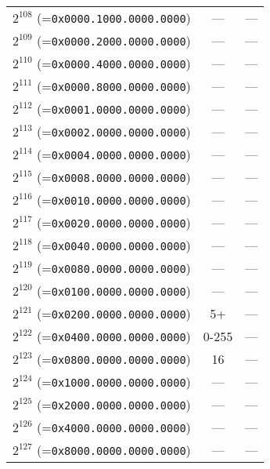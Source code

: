 \documentclass[documentation]{subfiles}
\begin{document}
\begin{small}
\begin{longtable}{rcl}
        $2^{108}$ (={\tt 0x0000.1000.0000.0000}) & ---   & ---\\
        $2^{109}$ (={\tt 0x0000.2000.0000.0000}) & ---   & ---\\
        $2^{110}$ (={\tt 0x0000.4000.0000.0000}) & ---   & ---\\
        $2^{111}$ (={\tt 0x0000.8000.0000.0000}) & ---   & ---\\
        $2^{112}$ (={\tt 0x0001.0000.0000.0000}) & ---   & ---\\
        $2^{113}$ (={\tt 0x0002.0000.0000.0000}) & ---   & ---\\
        $2^{114}$ (={\tt 0x0004.0000.0000.0000}) & ---   & ---\\
        $2^{115}$ (={\tt 0x0008.0000.0000.0000}) & ---   & ---\\
        $2^{116}$ (={\tt 0x0010.0000.0000.0000}) & ---   & ---\\
        $2^{117}$ (={\tt 0x0020.0000.0000.0000}) & ---   & ---\\
        $2^{118}$ (={\tt 0x0040.0000.0000.0000}) & ---   & ---\\
        $2^{119}$ (={\tt 0x0080.0000.0000.0000}) & ---   & ---\\
        $2^{120}$ (={\tt 0x0100.0000.0000.0000}) & ---   & ---\\
        $2^{121}$ (={\tt 0x0200.0000.0000.0000}) & 5+    & ---\\
        $2^{122}$ (={\tt 0x0400.0000.0000.0000}) & 0-255 & ---\\
        $2^{123}$ (={\tt 0x0800.0000.0000.0000}) & 16    & ---\\
        $2^{124}$ (={\tt 0x1000.0000.0000.0000}) & ---   & ---\\
        $2^{125}$ (={\tt 0x2000.0000.0000.0000}) & ---   & ---\\
        $2^{126}$ (={\tt 0x4000.0000.0000.0000}) & ---   & ---\\
        $2^{127}$ (={\tt 0x8000.0000.0000.0000}) & ---   & ---\\
        \bottomrule
    \end{longtable}
\end{small}
\end{document}
